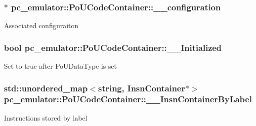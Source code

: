 \subsubsection[{\texorpdfstring{\+\_\+\+\_\+configuration}{__configuration}}]{$\ast$ pc\+\_\+emulator\+::\+Po\+U\+Code\+Container\+::\+\_\+\+\_\+configuration}\hypertarget{classpc__emulator_1_1PoUCodeContainer_a148557c2b2cea42835df72bade8de647}{}\label{classpc__emulator_1_1PoUCodeContainer_a148557c2b2cea42835df72bade8de647}
Associated configuraiton 
\subsubsection[{\texorpdfstring{\+\_\+\+\_\+\+Initialized}{__Initialized}}]{\setlength{\rightskip}{0pt plus 5cm}bool pc\+\_\+emulator\+::\+Po\+U\+Code\+Container\+::\+\_\+\+\_\+\+Initialized}\hypertarget{classpc__emulator_1_1PoUCodeContainer_a27bd5fec4acbe018dc5b2d0628c3961a}{}\label{classpc__emulator_1_1PoUCodeContainer_a27bd5fec4acbe018dc5b2d0628c3961a}
Set to true after Po\+U\+Data\+Type is set 
\subsubsection[{\texorpdfstring{\+\_\+\+\_\+\+Insn\+Container\+By\+Label}{__InsnContainerByLabel}}]{\setlength{\rightskip}{0pt plus 5cm}std\+::unordered\+\_\+map$<$string, {\bf Insn\+Container}$\ast$$>$ pc\+\_\+emulator\+::\+Po\+U\+Code\+Container\+::\+\_\+\+\_\+\+Insn\+Container\+By\+Label}\hypertarget{classpc__emulator_1_1PoUCodeContainer_a6417c381b46c8c514a873edab795b36a}{}\label{classpc__emulator_1_1PoUCodeContainer_a6417c381b46c8c514a873edab795b36a}
Instructions stored by label 

